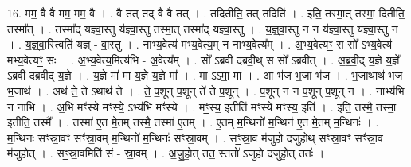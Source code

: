 \documentclass[17pt]{extarticle}
\begin{document}
16. मम॒ वै वै मम॒ मम॒ वै । . वै तत् तद् वै वै तत् । . तदितीति॒ तत् तदिति॑ । . इति॒ तस्मा॒त् तस्मा॒ दितीति॒ तस्मा᳚त् । . तस्मा᳚द् यज्ञ्वा॒स्तु य॑ज्ञ्वा॒स्तु तस्मा॒त् तस्मा᳚द् यज्ञ्वा॒स्तु । . य॒ज्ञ्॒वा॒स्तु न न य॑ज्ञ्वा॒स्तु य॑ज्ञ्वा॒स्तु न । . य॒ज्ञ्॒वा॒स्त्विति॑ यज्ञ् - वा॒स्तु । . नाभ्य॒वेत्य॑ मभ्य॒वेत्य॒म् न नाभ्य॒वेत्य᳚म् । . अ॒भ्य॒वेत्यꣳ॒॒ स सो᳚ ऽभ्य॒वेत्य॑ मभ्य॒वेत्यꣳ॒॒ सः । . अ॒भ्य॒वेत्य॒मित्य॑भि - अ॒वेत्य᳚म् । . सो᳚ ऽब्रवी दब्रवी॒थ् स सो᳚ ऽब्रवीत् । . अ॒ब्र॒वी॒द् य॒ज्ञे य॒ज्ञे᳚ ऽब्रवी दब्रवीद् य॒ज्ञे । . य॒ज्ञे मा॑ मा य॒ज्ञे य॒ज्ञे मा᳚ । . मा ऽऽमा॒ मा । . आ भ॑ज भ॒जा भ॑ज । . भ॒जाथाथ॑ भज भ॒जाथ॑ । . अथ॑ ते॒ ते ऽथाथ॑ ते । . ते॒ प॒शून् प॒शून् ते॑ ते प॒शून् । . प॒शून् न न प॒शून् प॒शून् न । . नाभ्य॑भि न नाभि । . अ॒भि मꣳ॑स्ये मꣳस्ये॒ ऽभ्य॑भि मꣳ॑स्ये । . मꣳ॒॒स्य॒ इतीति॑ मꣳस्ये मꣳस्य॒ इति॑ । . इति॒ तस्मै॒ तस्मा॒ इतीति॒ तस्मै᳚ । . तस्मा॑ ए॒त मे॒तम् तस्मै॒ तस्मा॑ ए॒तम् । . ए॒तम् म॒न्थिनो॑ म॒न्थिन॑ ए॒त मे॒तम् म॒न्थिनः॑ । . म॒न्थिनः॑ सꣳस्रा॒वꣳ सꣳ॑स्रा॒वम् म॒न्थिनो॑ म॒न्थिनः॑ सꣳस्रा॒वम् । . सꣳ॒॒स्रा॒व म॑जुहो दजुहोथ् सꣳस्रा॒वꣳ सꣳ॑स्रा॒व म॑जुहोत् । . सꣳ॒॒स्रा॒वमिति॑ सं - स्रा॒वम् । . अ॒जु॒हो॒त् तत॒ स्ततो॑ ऽजुहो दजुहो॒त् ततः॑ । \newline
\end{document}
